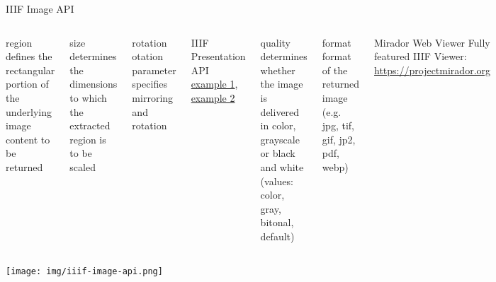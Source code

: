 \begin{frame}{IIIF Image API}

\begin{columns}
\begin{block}{region}\footnotesize
defines the rectangular portion of the
underlying image content to be returned
\end{block}

\begin{block}{size}\footnotesize
determines the dimensions to which the
extracted region is to be scaled
\end{block}

\begin{block}{rotation}\footnotesize
 otation parameter specifies mirroring and rotation
\end{block}
\begin{block}{IIIF Presentation API}\footnotesize
\href{https://jubilees.stmarytx.edu/mirador/index.html}{example 1}, 
\href{https://jubilees.stmarytx.edu/iiifp/KB_Collin-36-III-082/manifest.json}{example 2}
\end{block}

\begin{block}{quality}\footnotesize
determines whether the image is delivered in
color, grayscale or black and white (values: color, gray, bitonal, default)
\end{block} 

\begin{block}{format}\footnotesize
format of the returned image (e.g. jpg, tif, gif, jp2, pdf, webp)
\end{block} 

\begin{block}{Mirador Web Viewer}\footnotesize
Fully featured IIIF Viewer: \protect\url{https://projectmirador.org}
\end{block}


\end{columns}

\texttt{[image: img/iiif-image-api.png]}
\end{frame}




